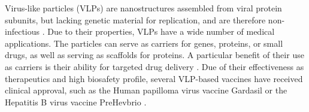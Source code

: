 

Virus-like particles (VLPs) are nanostructures assembled from viral protein subunits, but lacking genetic material for replication, and are therefore non-infectious \cite{vlps_def}. Due to their properties, VLPs have a wide number of medical applications. The particles can serve as carriers for genes, proteins, or small drugs, as well as serving as scaffolds for proteins. A particular benefit of their use as carriers is their ability for targeted drug delivery \cite{vlps_review}. Due of their effectiveness as therapeutics and high biosafety profile, several VLP-based vaccines have received clinical approval, such as the Human papilloma virus vaccine Gardasil\textsuperscript{\textregistered} or the Hepatitis B virus vaccine PreHevbrio\textsuperscript{\textregistered} \cite{vlps_clinically_approved}.

